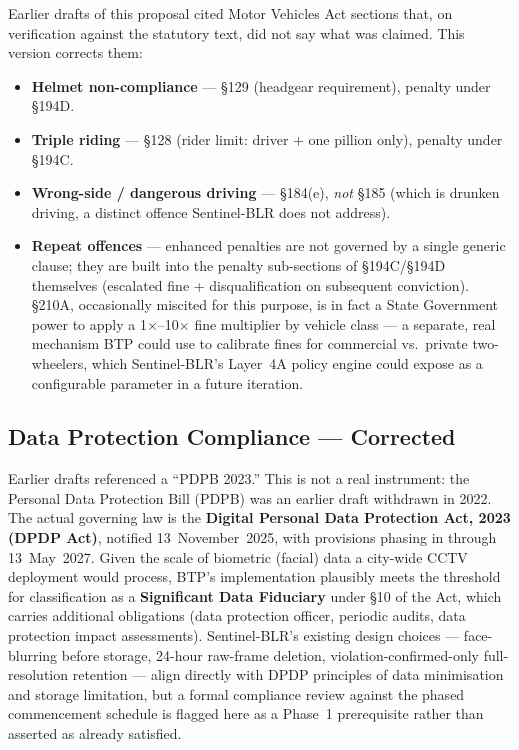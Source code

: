 \documentclass[11pt,a4paper]{article}
\begin{document}
Earlier drafts of this proposal cited Motor Vehicles Act sections that, on verification against the statutory text, did not say what was claimed. This version corrects them:

\begin{itemize}[leftmargin=1.8em, itemsep=0.3em]
    \item \textbf{Helmet non-compliance} --- \S129 (headgear requirement), penalty under \S194D.
    \item \textbf{Triple riding} --- \S128 (rider limit: driver + one pillion only), penalty under \S194C.
    \item \textbf{Wrong-side / dangerous driving} --- \S184(e), \emph{not} \S185 (which is drunken driving, a distinct offence Sentinel-BLR does not address).
    \item \textbf{Repeat offences} --- enhanced penalties are not governed by a single generic clause; they are built into the penalty sub-sections of \S194C/\S194D themselves (escalated fine + disqualification on subsequent conviction). \S210A, occasionally miscited for this purpose, is in fact a State Government power to apply a 1$\times$--10$\times$ fine multiplier by vehicle class --- a separate, real mechanism BTP could use to calibrate fines for commercial vs.\ private two-wheelers, which Sentinel-BLR's Layer~4A policy engine could expose as a configurable parameter in a future iteration.
\end{itemize}

\subsection*{Data Protection Compliance --- Corrected}

Earlier drafts referenced a ``PDPB 2023.'' This is not a real instrument: the Personal Data Protection Bill (PDPB) was an earlier draft withdrawn in 2022. The actual governing law is the \textbf{Digital Personal Data Protection Act, 2023 (DPDP Act)}, notified 13~November~2025, with provisions phasing in through 13~May~2027. Given the scale of biometric (facial) data a city-wide CCTV deployment would process, BTP's implementation plausibly meets the threshold for classification as a \textbf{Significant Data Fiduciary} under \S10 of the Act, which carries additional obligations (data protection officer, periodic audits, data protection impact assessments). Sentinel-BLR's existing design choices --- face-blurring before storage, 24-hour raw-frame deletion, violation-confirmed-only full-resolution retention --- align directly with DPDP principles of data minimisation and storage limitation, but a formal compliance review against the phased commencement schedule is flagged here as a Phase~1 prerequisite rather than asserted as already satisfied.
\end{document}

